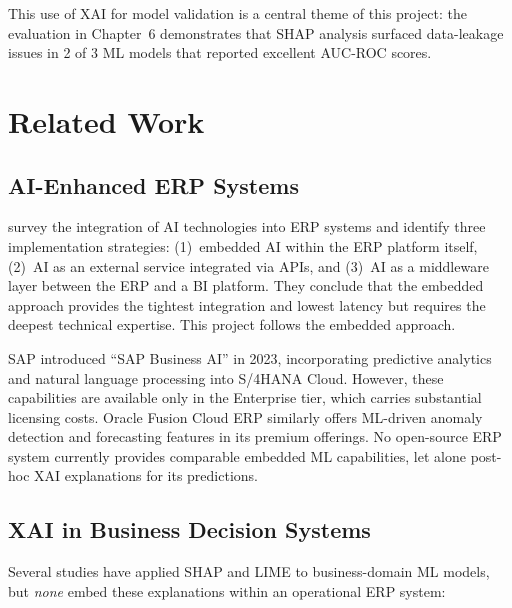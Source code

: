 \documentclass[12pt,a4paper]{report}
\begin{document}
This use of XAI for model validation is a central theme of this project: the evaluation in Chapter~6 demonstrates that SHAP analysis surfaced data-leakage issues in 2 of 3 ML models that reported excellent AUC-ROC scores.


\section{Related Work}
\label{sec:related_work}

\subsection{AI-Enhanced ERP Systems}

\citet{lee2020erp} survey the integration of AI technologies into ERP systems and identify three implementation strategies: (1)~embedded AI within the ERP platform itself, (2)~AI as an external service integrated via APIs, and (3)~AI as a middleware layer between the ERP and a BI platform. They conclude that the embedded approach provides the tightest integration and lowest latency but requires the deepest technical expertise. This project follows the embedded approach.

SAP introduced ``SAP Business AI'' in 2023, incorporating predictive analytics and natural language processing into S/4HANA Cloud. However, these capabilities are available only in the Enterprise tier, which carries substantial licensing costs. Oracle Fusion Cloud ERP similarly offers ML-driven anomaly detection and forecasting features in its premium offerings. No open-source ERP system currently provides comparable embedded ML capabilities, let alone post-hoc XAI explanations for its predictions.

\subsection{XAI in Business Decision Systems}

Several studies have applied SHAP and LIME to business-domain ML models, but \textit{none} embed these explanations within an operational ERP system:
\end{document}
